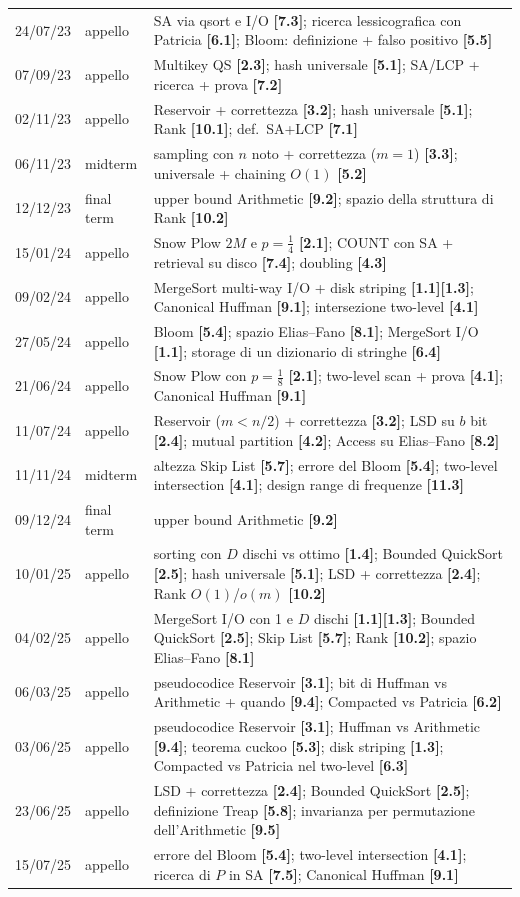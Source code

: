 \documentclass[11pt,a4paper]{article}
\newcommand{\qid}[1]{\textbf{[#1]}}
\newcommand{\OO}[1]{O\!\left(#1\right)}
\begin{document}
\begin{longtable}{@{}p{2.6cm}p{2.2cm}p{10.2cm}@{}}
24/07/23 & appello & SA via qsort e I/O \qid{7.3}; ricerca lessicografica con Patricia \qid{6.1}; Bloom: definizione + falso positivo \qid{5.5}\\
07/09/23 & appello & Multikey QS \qid{2.3}; hash universale \qid{5.1}; SA/LCP + ricerca + prova \qid{7.2}\\
02/11/23 & appello & Reservoir + correttezza \qid{3.2}; hash universale \qid{5.1}; Rank \qid{10.1}; def.\ SA+LCP \qid{7.1}\\
06/11/23 & midterm & sampling con $n$ noto + correttezza ($m=1$) \qid{3.3}; universale + chaining $\OO{1}$ \qid{5.2}\\
12/12/23 & final term & upper bound Arithmetic \qid{9.2}; spazio della struttura di Rank \qid{10.2}\\
15/01/24 & appello & Snow Plow $2M$ e $p=\tfrac14$ \qid{2.1}; COUNT con SA + retrieval su disco \qid{7.4}; doubling \qid{4.3}\\
09/02/24 & appello & MergeSort multi-way I/O + disk striping \qid{1.1}\qid{1.3}; Canonical Huffman \qid{9.1}; intersezione two-level \qid{4.1}\\
27/05/24 & appello & Bloom \qid{5.4}; spazio Elias--Fano \qid{8.1}; MergeSort I/O \qid{1.1}; storage di un dizionario di stringhe \qid{6.4}\\
21/06/24 & appello & Snow Plow con $p=\tfrac18$ \qid{2.1}; two-level scan + prova \qid{4.1}; Canonical Huffman \qid{9.1}\\
11/07/24 & appello & Reservoir ($m<n/2$) + correttezza \qid{3.2}; LSD su $b$ bit \qid{2.4}; mutual partition \qid{4.2}; Access su Elias--Fano \qid{8.2}\\
11/11/24 & midterm & altezza Skip List \qid{5.7}; errore del Bloom \qid{5.4}; two-level intersection \qid{4.1}; design range di frequenze \qid{11.3}\\
09/12/24 & final term & upper bound Arithmetic \qid{9.2}\\
10/01/25 & appello & sorting con $D$ dischi vs ottimo \qid{1.4}; Bounded QuickSort \qid{2.5}; hash universale \qid{5.1}; LSD + correttezza \qid{2.4}; Rank $\OO{1}$/$o(m)$ \qid{10.2}\\
04/02/25 & appello & MergeSort I/O con 1 e $D$ dischi \qid{1.1}\qid{1.3}; Bounded QuickSort \qid{2.5}; Skip List \qid{5.7}; Rank \qid{10.2}; spazio Elias--Fano \qid{8.1}\\
06/03/25 & appello & pseudocodice Reservoir \qid{3.1}; bit di Huffman vs Arithmetic + quando \qid{9.4}; Compacted vs Patricia \qid{6.2}\\
03/06/25 & appello & pseudocodice Reservoir \qid{3.1}; Huffman vs Arithmetic \qid{9.4}; teorema cuckoo \qid{5.3}; disk striping \qid{1.3}; Compacted vs Patricia nel two-level \qid{6.3}\\
23/06/25 & appello & LSD + correttezza \qid{2.4}; Bounded QuickSort \qid{2.5}; definizione Treap \qid{5.8}; invarianza per permutazione dell'Arithmetic \qid{9.5}\\
15/07/25 & appello & errore del Bloom \qid{5.4}; two-level intersection \qid{4.1}; ricerca di $P$ in SA \qid{7.5}; Canonical Huffman \qid{9.1}\\
\hline
\end{longtable}
\end{document}
